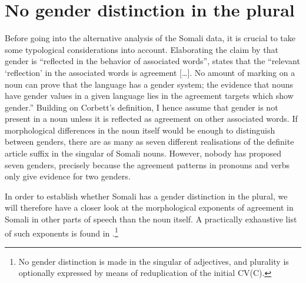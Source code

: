 \documentclass[output=paper]{langsci/langscibook}
\begin{document}
\section{No gender distinction in the plural}\label{sec:nilsson:2}

Before going into the alternative analysis of the Somali data, it is crucial to take some typological considerations into account. Elaborating the claim by \citet[231]{Hockett1958} that gender is “reflected in the behavior of associated words”, \citet[89--90]{Corbett2000} states that the “relevant ‘reflection’ in the associated words is agreement […]. No amount of marking on a noun can prove that the language has a gender system; the evidence that nouns have gender values in a given language lies in the agreement targets which show gender.” Building on Corbett’s definition, I hence assume that gender is not present in a noun unless it is reflected as agreement on other associated words. If morphological differences in the noun itself would be enough to distinguish between genders, there are as many as seven different realisations of the definite article suffix in the singular of Somali nouns. However, nobody has proposed seven genders, precisely because the agreement patterns in pronouns and verbs only give evidence for two genders. 

In order to establish whether Somali has a gender distinction in the plural, we will therefore have a closer look at the morphological exponents of agreement in Somali in other parts of speech than the noun itself. A practically exhaustive list of such exponents is found in .\footnote{No gender distinction is made in the singular of adjectives, and plurality is optionally expressed by means of reduplication of the initial CV(C).}
\end{document}
